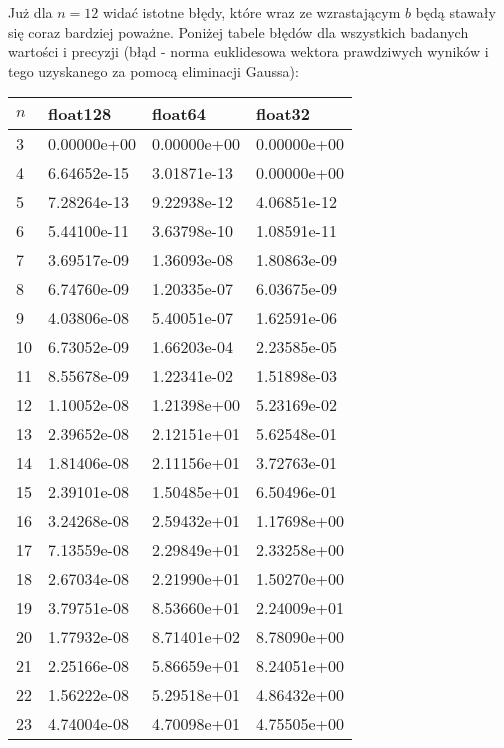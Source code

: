 \documentclass{article}
\begin{document}
Już dla $n=12$ widać istotne błędy, które wraz ze wzrastającym $b$ będą stawały się coraz bardziej poważne.
Poniżej tabele błędów dla wszystkich badanych wartości i precyzji (błąd - norma euklidesowa wektora prawdziwych wyników i tego
uzyskanego za pomocą eliminacji Gaussa):

\newpage
\thispagestyle{empty}

\begin{table}[H]
\parbox{.45\linewidth}{
\hspace*{-2.4cm}
\begin{tabular}{|l|l|l|l|}
\hline
$n$ & float128 & float64 & float32 \\ \hline
3 & 0.00000e+00 & 0.00000e+00 & 0.00000e+00 \\ \hline
4 & 6.64652e-15 & 3.01871e-13 & 0.00000e+00 \\ \hline
5 & 7.28264e-13 & 9.22938e-12 & 4.06851e-12 \\ \hline
6 & 5.44100e-11 & 3.63798e-10 & 1.08591e-11 \\ \hline
7 & 3.69517e-09 & 1.36093e-08 & 1.80863e-09 \\ \hline
8 & 6.74760e-09 & 1.20335e-07 & 6.03675e-09 \\ \hline
9 & 4.03806e-08 & 5.40051e-07 & 1.62591e-06 \\ \hline
10 & 6.73052e-09 & 1.66203e-04 & 2.23585e-05 \\ \hline
11 & 8.55678e-09 & 1.22341e-02 & 1.51898e-03 \\ \hline
12 & 1.10052e-08 & 1.21398e+00 & 5.23169e-02 \\ \hline
13 & 2.39652e-08 & 2.12151e+01 & 5.62548e-01 \\ \hline
14 & 1.81406e-08 & 2.11156e+01 & 3.72763e-01 \\ \hline
15 & 2.39101e-08 & 1.50485e+01 & 6.50496e-01 \\ \hline
16 & 3.24268e-08 & 2.59432e+01 & 1.17698e+00 \\ \hline
17 & 7.13559e-08 & 2.29849e+01 & 2.33258e+00 \\ \hline
18 & 2.67034e-08 & 2.21990e+01 & 1.50270e+00 \\ \hline
19 & 3.79751e-08 & 8.53660e+01 & 2.24009e+01 \\ \hline
20 & 1.77932e-08 & 8.71401e+02 & 8.78090e+00 \\ \hline
21 & 2.25166e-08 & 5.86659e+01 & 8.24051e+00 \\ \hline
22 & 1.56222e-08 & 5.29518e+01 & 4.86432e+00 \\ \hline
23 & 4.74004e-08 & 4.70098e+01 & 4.75505e+00 \\ \hline

\end{tabular}}
\end{table}
\end{document}
